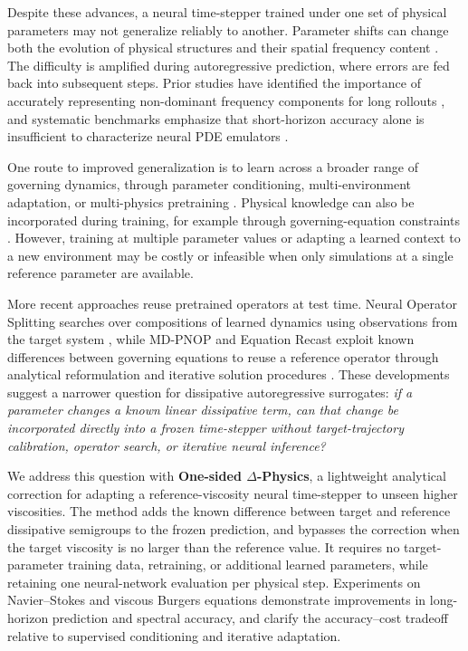 \documentclass[10pt,twocolumn]{article}
\begin{document}
Despite these advances, a neural time-stepper trained under one set of physical parameters may not generalize reliably to another. Parameter shifts can change both the evolution of physical structures and their spatial frequency content \cite{gupta2023multiscale}. The difficulty is amplified during autoregressive prediction, where errors are fed back into subsequent steps. Prior studies have identified the importance of accurately representing non-dominant frequency components for long rollouts \cite{lippe2023pderefiner}, and systematic benchmarks emphasize that short-horizon accuracy alone is insufficient to characterize neural PDE emulators \cite{koehler2024apebench}.

One route to improved generalization is to learn across a broader range of governing dynamics, through parameter conditioning, multi-environment adaptation, or multi-physics pretraining \cite{gupta2023multiscale,kirchmeyer2022coda,koupai2024geps,mccabe2024mpp,herde2024poseidon}. Physical knowledge can also be incorporated during training, for example through governing-equation constraints \cite{li2024pino}. However, training at multiple parameter values or adapting a learned context to a new environment may be costly or infeasible when only simulations at a single reference parameter are available.

More recent approaches reuse pretrained operators at test time. Neural Operator Splitting searches over compositions of learned dynamics using observations from the target system \cite{serrano2026splitting}, while MD-PNOP and Equation Recast exploit known differences between governing equations to reuse a reference operator through analytical reformulation and iterative solution procedures \cite{cheng2026mdpnop,cheng2026recast}. These developments suggest a narrower question for dissipative autoregressive surrogates: \emph{if a parameter changes a known linear dissipative term, can that change be incorporated directly into a frozen time-stepper without target-trajectory calibration, operator search, or iterative neural inference?}

We address this question with \textbf{One-sided $\Delta$-Physics}, a lightweight analytical correction for adapting a reference-viscosity neural time-stepper to unseen higher viscosities. The method adds the known difference between target and reference dissipative semigroups to the frozen prediction, and bypasses the correction when the target viscosity is no larger than the reference value. It requires no target-parameter training data, retraining, or additional learned parameters, while retaining one neural-network evaluation per physical step. Experiments on Navier--Stokes and viscous Burgers equations demonstrate improvements in long-horizon prediction and spectral accuracy, and clarify the accuracy--cost tradeoff relative to supervised conditioning and iterative adaptation.
\end{document}
